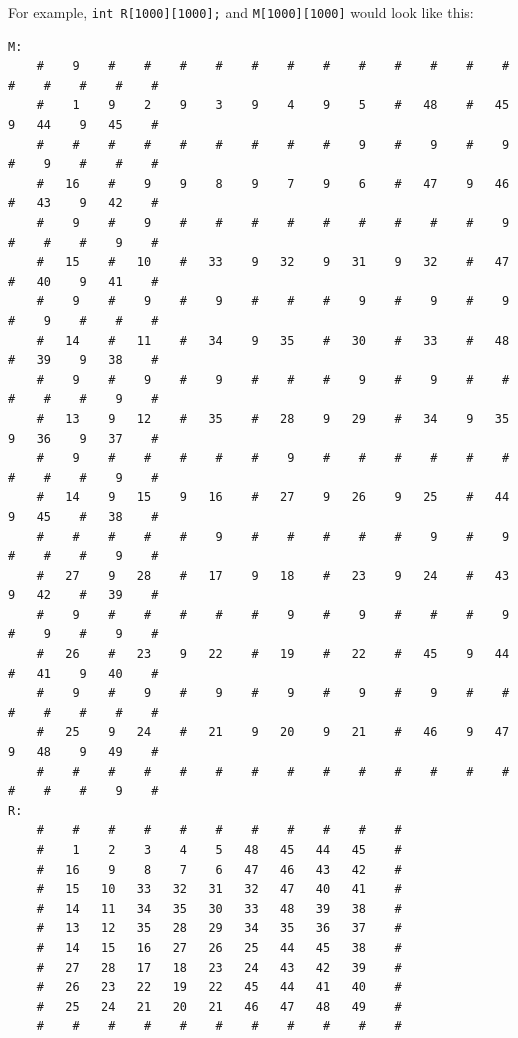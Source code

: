 \documentclass[cn,black,12pt,normal]{elegantnote}
\begin{document}
For example, \lstinline{int R[1000][1000];} and \lstinline{M[1000][1000]} would look like this:
\begin{lstlisting}[basicstyle=\tiny\ttfamily]
M:
    #    9    #    #    #    #    #    #    #    #    #    #    #    #    #    #    #    #    #
    #    1    9    2    9    3    9    4    9    5    #   48    #   45    9   44    9   45    #
    #    #    #    #    #    #    #    #    #    9    #    9    #    9    #    9    #    #    #
    #   16    #    9    9    8    9    7    9    6    #   47    9   46    #   43    9   42    #
    #    9    #    9    #    #    #    #    #    #    #    #    #    9    #    #    #    9    #
    #   15    #   10    #   33    9   32    9   31    9   32    #   47    #   40    9   41    #
    #    9    #    9    #    9    #    #    #    9    #    9    #    9    #    9    #    #    #
    #   14    #   11    #   34    9   35    #   30    #   33    #   48    #   39    9   38    #
    #    9    #    9    #    9    #    #    #    9    #    9    #    #    #    #    #    9    #
    #   13    9   12    #   35    #   28    9   29    #   34    9   35    9   36    9   37    #
    #    9    #    #    #    #    #    9    #    #    #    #    #    #    #    #    #    9    #
    #   14    9   15    9   16    #   27    9   26    9   25    #   44    9   45    #   38    #
    #    #    #    #    #    9    #    #    #    #    #    9    #    9    #    #    #    9    #
    #   27    9   28    #   17    9   18    #   23    9   24    #   43    9   42    #   39    #
    #    9    #    #    #    #    #    9    #    9    #    #    #    9    #    9    #    9    #
    #   26    #   23    9   22    #   19    #   22    #   45    9   44    #   41    9   40    #
    #    9    #    9    #    9    #    9    #    9    #    9    #    #    #    #    #    #    #
    #   25    9   24    #   21    9   20    9   21    #   46    9   47    9   48    9   49    #
    #    #    #    #    #    #    #    #    #    #    #    #    #    #    #    #    #    9    #
R:
    #    #    #    #    #    #    #    #    #    #    #
    #    1    2    3    4    5   48   45   44   45    #
    #   16    9    8    7    6   47   46   43   42    #
    #   15   10   33   32   31   32   47   40   41    #
    #   14   11   34   35   30   33   48   39   38    #
    #   13   12   35   28   29   34   35   36   37    #
    #   14   15   16   27   26   25   44   45   38    #
    #   27   28   17   18   23   24   43   42   39    #
    #   26   23   22   19   22   45   44   41   40    #
    #   25   24   21   20   21   46   47   48   49    #
    #    #    #    #    #    #    #    #    #    #    #
\end{lstlisting}
\end{document}
